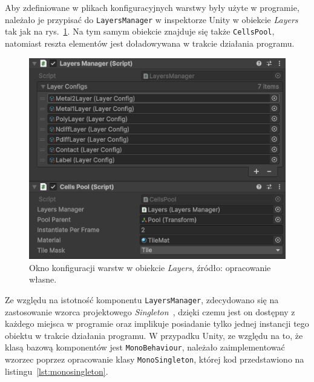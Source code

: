 Aby zdefiniowane w plikach konfiguracyjnych warstwy były użyte w programie,
należało je przypisać do \texttt{LayersManager} w inspektorze Unity w obiekcie \textit{Layers} tak jak na rys.~\ref{fig:layers}.
Na tym samym obiekcie znajduje się także \texttt{CellsPool},
natomiast reszta elementów jest doładowywana w trakcie działania programu.

\newpage %

\begin{figure}[h]
    \centering
    \includegraphics[width=.9\textwidth]{chapters/chapter4/rys/layers}
    \caption[Okno konfiguracji warstw w obiekcie \textit{Layers}.]
    {Okno konfiguracji warstw w obiekcie \textit{Layers}, źródło: opracowanie własne.}
    \label{fig:layers}
\end{figure}

Ze względu na istotność komponentu \texttt{LayersManager},
zdecydowano się na zastosowanie wzorca projektowego \textit{Singleton}~\cite{unity_csharp},
dzięki czemu jest on dostępny z każdego miejsca w programie
oraz implikuje posiadanie tylko jednej instancji tego obiektu w trakcie działania programu.
W przypadku Unity, ze względu na to, że klasą bazową komponentów jest \texttt{MonoBehaviour},
należało zaimplementować wzorzec poprzez opracowanie klasy \texttt{MonoSingleton},
której kod przedstawiono na listingu~\ref{lst:monosingleton}.


